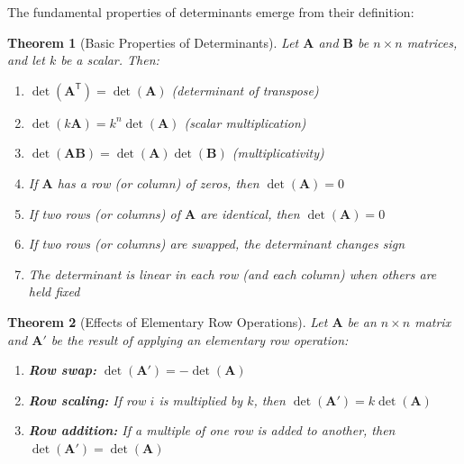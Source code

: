 \documentclass[12pt]{article}
\numberwithin{equation}{section}
\newcommand{\mat}[1]{\mathbf{#1}}        %
\newcommand{\trans}{\mathsf{T}}          %
\theoremstyle{plain}
\newtheorem{theorem}{Theorem}[section]
\theoremstyle{definition}
\theoremstyle{remark}
\begin{document}
The fundamental properties of determinants emerge from their definition:

\begin{theorem}[Basic Properties of Determinants]
Let $\mat{A}$ and $\mat{B}$ be $n \times n$ matrices, and let $k$ be a scalar. Then:
\begin{enumerate}
\item $\det(\mat{A}^{\trans}) = \det(\mat{A})$ (determinant of transpose)
\item $\det(k\mat{A}) = k^n\det(\mat{A})$ (scalar multiplication)
\item $\det(\mat{A}\mat{B}) = \det(\mat{A})\det(\mat{B})$ (multiplicativity)
\item If $\mat{A}$ has a row (or column) of zeros, then $\det(\mat{A}) = 0$
\item If two rows (or columns) of $\mat{A}$ are identical, then $\det(\mat{A}) = 0$
\item If two rows (or columns) are swapped, the determinant changes sign
\item The determinant is linear in each row (and each column) when others are held fixed
\end{enumerate}
\end{theorem}

\begin{theorem}[Effects of Elementary Row Operations]
Let $\mat{A}$ be an $n \times n$ matrix and $\mat{A}'$ be the result of applying an elementary row operation:
\begin{enumerate}
\item \textbf{Row swap:} $\det(\mat{A}') = -\det(\mat{A})$
\item \textbf{Row scaling:} If row $i$ is multiplied by $k$, then $\det(\mat{A}') = k\det(\mat{A})$
\item \textbf{Row addition:} If a multiple of one row is added to another, then $\det(\mat{A}') = \det(\mat{A})$
\end{enumerate}
\end{theorem}
\end{document}

